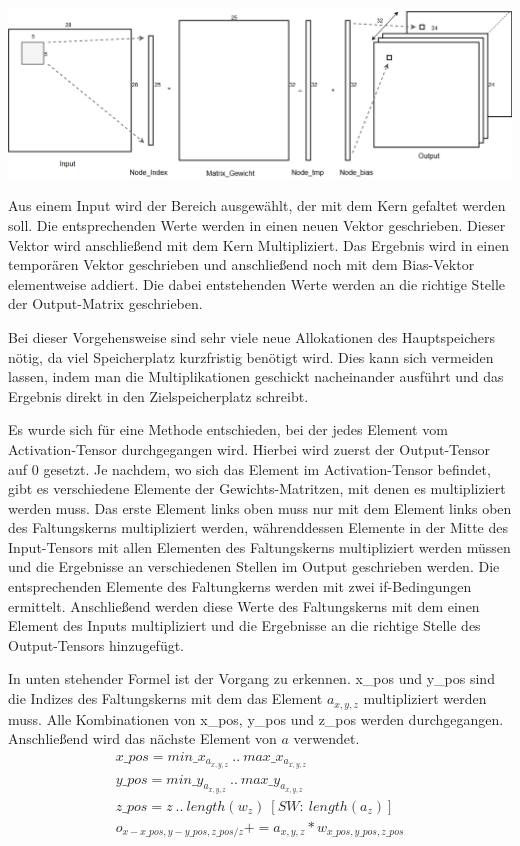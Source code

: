 \documentclass[../main.tex]{subfiles}
\begin{document}
\includegraphics[width=\textwidth]{../images/Benz/Conv_Layer_Seriel.png} %

Aus einem Input wird der Bereich ausgewählt, der mit dem Kern gefaltet werden soll. Die entsprechenden Werte werden in einen neuen Vektor geschrieben. Dieser Vektor wird anschließend mit dem Kern Multipliziert. Das Ergebnis wird in einen temporären Vektor geschrieben und anschließend noch mit dem Bias-Vektor elementweise addiert. Die dabei entstehenden Werte werden an die richtige Stelle der Output-Matrix geschrieben.

Bei dieser Vorgehensweise sind sehr viele neue Allokationen des Hauptspeichers nötig, da viel Speicherplatz kurzfristig benötigt wird. Dies kann sich vermeiden lassen, indem man die Multiplikationen geschickt nacheinander ausführt und das Ergebnis direkt in den Zielspeicherplatz schreibt. 

Es wurde sich für eine Methode entschieden, bei der jedes Element vom Activation-Tensor durchgegangen wird. Hierbei wird zuerst der Output-Tensor auf 0 gesetzt. Je nachdem, wo sich das Element im Activation-Tensor befindet, gibt es verschiedene Elemente der Gewichts-Matritzen, mit denen es multipliziert werden muss. Das erste Element links oben muss nur mit dem Element links oben des Faltungskerns multipliziert werden, währenddessen Elemente in der Mitte des Input-Tensors mit allen Elementen des Faltungskerns multipliziert werden müssen und die Ergebnisse an verschiedenen Stellen im Output geschrieben werden. Die entsprechenden Elemente des Faltungkerns werden mit zwei if-Bedingungen ermittelt. Anschließend werden diese Werte des Faltungskerns mit dem einen Element des Inputs multipliziert und die Ergebnisse an die richtige Stelle des Output-Tensors hinzugefügt.

In unten stehender Formel ist der Vorgang zu erkennen. x\_pos und y\_pos sind die Indizes des Faltungskerns mit dem das Element \(a_{x,y,z}\) multipliziert werden muss. Alle Kombinationen von x\_pos, y\_pos und z\_pos werden durchgegangen. Anschließend wird das nächste Element von \(a\) verwendet.
\begin{equation}
\begin{split}
x\_pos = {min\_x_{a_{x,y,z}}\ ..\ max\_x_{a_{x,y,z}}}\\
y\_pos = {min\_y_{a_{x,y,z}}\ ..\ max\_y_{a_{x,y,z}}}\\
z\_pos = {z\ ..\ length(w_{z})\ [SW:\ length(a_{z})]}\\
o_{x-x\_pos,y-y\_pos,z\_pos/z} += a_{x,y,z}*w_{x\_pos,y\_pos,z\_pos}
\end{split}
\end{equation}
\end{document}
